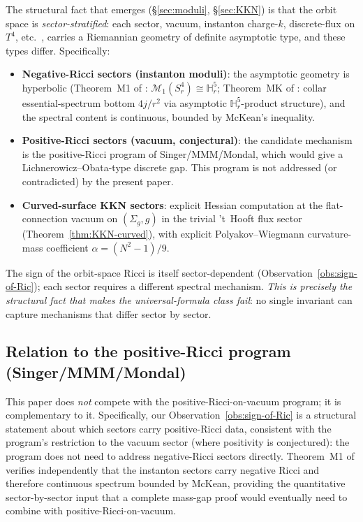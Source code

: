 \documentclass[11pt,letterpaper]{article}
\theoremstyle{definition}
\newcommand{\bbH}{\mathbb{H}}
\newcommand{\cM}{\mathcal{M}}
\begin{document}
The structural fact that emerges (\S\ref{sec:moduli}, \S\ref{sec:KKN}) is that the orbit space is \emph{sector-stratified}: each sector, vacuum, instanton charge-$k$, discrete-flux on $T^4$, etc.~,  carries a Riemannian geometry of definite asymptotic type, and these types differ. Specifically:
\begin{itemize}[leftmargin=2em]
\item \textbf{Negative-Ricci sectors (instanton moduli)}: the asymptotic geometry is hyperbolic (Theorem~M1 of \cite{bonfioli-core}: $\cM_1(S^4_r) \cong \bbH^5_r$; Theorem~MK of \cite{bonfioli-core}: collar essential-spectrum bottom $4j/r^2$ via asymptotic $\bbH^5_r$-product structure), and the spectral content is continuous, bounded by McKean's inequality.
\item \textbf{Positive-Ricci sectors (vacuum, conjectural)}: the candidate mechanism is the positive-Ricci program of Singer/MMM/Mondal, which would give a Lichnerowicz--Obata-type discrete gap. This program is not addressed (or contradicted) by the present paper.
\item \textbf{Curved-surface KKN sectors}: explicit Hessian computation at the flat-connection vacuum on $(\Sigma_g, g)$ in the trivial 't~Hooft flux sector (Theorem~\ref{thm:KKN-curved}), with explicit Polyakov--Wiegmann curvature-mass coefficient $\alpha = (N^2-1)/9$.
\end{itemize}

The sign of the orbit-space Ricci is itself sector-dependent (Observation~\ref{obs:sign-of-Ric}); each sector requires a different spectral mechanism. \emph{This is precisely the structural fact that makes the universal-formula class fail}: no single invariant can capture mechanisms that differ sector by sector.

\subsection{Relation to the positive-Ricci program (Singer/MMM/Mondal)}

This paper does \emph{not} compete with the positive-Ricci-on-vacuum program; it is complementary to it. Specifically, our Observation~\ref{obs:sign-of-Ric} is a structural statement about which sectors carry positive-Ricci data, consistent with the program's restriction to the vacuum sector (where positivity is conjectured): the program does not need to address negative-Ricci sectors directly. Theorem~M1 of \cite{bonfioli-core} verifies independently that the instanton sectors carry negative Ricci and therefore continuous spectrum bounded by McKean, providing the quantitative sector-by-sector input that a complete mass-gap proof would eventually need to combine with positive-Ricci-on-vacuum.
\end{document}
